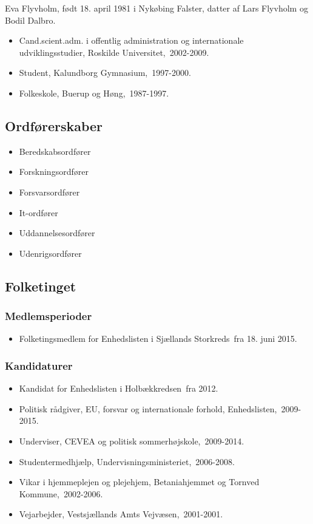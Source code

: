 \documentclass[11pt, a4paper]{awesome-cv}
\begin{document}
\makecvheader[R]
\makelettertitle
\begin{cvletter}
Eva Flyvholm, født 18. april 1981 i Nykøbing Falster, datter af Lars Flyvholm og Bodil Dalbro.

\begin{itemize}
\item Cand.scient.adm. i offentlig administration og internationale udviklingsstudier, Roskilde Universitet, 2002-2009.
\item Student, Kalundborg Gymnasium, 1997-2000.
\item Folkeskole, Buerup og Høng, 1987-1997.
\end{itemize}
\subsection*{Ordførerskaber}
\begin{itemize}
\item Beredskabsordfører
\item Forskningsordfører
\item Forsvarsordfører
\item It-ordfører
\item Uddannelsesordfører
\item Udenrigsordfører
\end{itemize}
\subsection*{Folketinget}
\subsubsection*{Medlemsperioder}
\begin{itemize}
\item Folketingsmedlem for Enhedslisten i Sjællands Storkreds fra 18. juni 2015.
\end{itemize}
\subsubsection*{Kandidaturer}
\begin{itemize}
\item Kandidat for Enhedslisten i Holbækkredsen fra 2012.
\end{itemize}
\begin{itemize}
\item Politisk rådgiver, EU, forsvar og internationale forhold, Enhedslisten, 2009-2015.
\item Underviser, CEVEA og politisk sommerhøjskole, 2009-2014.
\item Studentermedhjælp, Undervisningsministeriet, 2006-2008.
\item Vikar i hjemmeplejen og plejehjem, Betaniahjemmet og Tornved Kommune, 2002-2006.
\item Vejarbejder, Vestsjællands Amts Vejvæsen, 2001-2001.
\end{itemize}
\end{cvletter}
\end{document}
